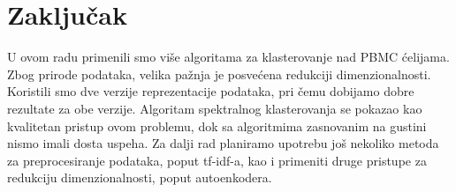 \documentclass[a4paper]{article}
\begin{document}
\section{Zaključak}
U ovom radu primenili smo više algoritama za klasterovanje nad PBMC ćelijama. Zbog prirode podataka, velika pažnja je posvećena redukciji dimenzionalnosti. Koristili smo dve verzije reprezentacije podataka, pri čemu dobijamo dobre rezultate za obe verzije. Algoritam spektralnog klasterovanja se pokazao kao kvalitetan pristup ovom problemu, dok sa algoritmima zasnovanim na gustini nismo imali dosta uspeha. Za dalji rad planiramo upotrebu još nekoliko metoda za preprocesiranje podataka, poput tf-idf-a, kao i primeniti druge pristupe za redukciju dimenzionalnosti, poput autoenkodera.





















\appendix
\end{document}
